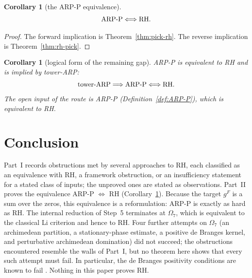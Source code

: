 \documentclass[11pt]{amsart}
\newtheorem{corollary}[theorem]{Corollary}
\theoremstyle{definition}
\theoremstyle{remark}
\theoremstyle{definition}
\begin{document}
\begin{corollary}[the ARP-P equivalence]\label{cor:live-equivalence}
\[
   \textnormal{ARP-P}\Longleftrightarrow\textnormal{RH}.
\]
\end{corollary}

\begin{proof}
The forward implication is Theorem~\ref{thm:pick-rh}.  The reverse implication is
Theorem~\ref{thm:rh-pick}.
\end{proof}


\begin{corollary}[logical form of the remaining gap]\label{cor:gap-status}
ARP-P is equivalent to RH and is implied by tower-ARP:
\[
   \textnormal{tower-ARP}\Longrightarrow\textnormal{ARP-P}\Longleftrightarrow\textnormal{RH}.
\]
The open input of the route is ARP-P (Definition~\ref{def:ARP-P}), which is equivalent to RH.
\end{corollary}


\section{Conclusion}\label{sec:epilogue}

Part~I records obstructions met by several approaches to RH, each classified as an equivalence with RH,
a framework obstruction, or an insufficiency statement for a stated class of inputs; the unproved ones are
stated as observations. Part~II proves the equivalence ARP-P $\Leftrightarrow$ RH
(Corollary~\ref{cor:live-equivalence}). Because the target $g^F$ is a sum over the zeros, this
equivalence is a reformulation: ARP-P is exactly as hard as RH. The internal reduction of Step~5
terminates at $\Omega_7$, which is equivalent to the classical Li criterion \cite{Li,BombieriLagarias1999}
and hence to RH. Four further attempts on $\Omega_7$ (an archimedean partition, a stationary-phase
estimate, a positive de Branges kernel, and perturbative archimedean domination) did not succeed; the
obstructions encountered resemble the walls of Part~I, but no theorem here shows that every such attempt
must fail. In particular, the de Branges positivity conditions are known to fail \cite{ConreyLi}.
Nothing in this paper proves RH.

\appendix
\end{document}

